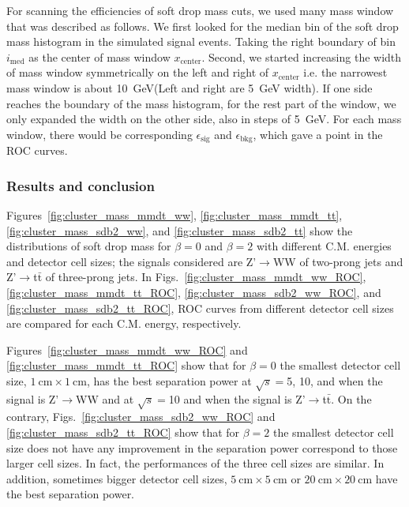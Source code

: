 \documentclass[12pt,twoside,a4paper,an,final]{cms-tdr}
\begin{document}
For scanning the efficiencies of soft drop mass cuts, we used many mass 
window that was described as follows. We first looked for the median bin 
 of the soft drop mass histogram in the simulated signal events. Taking the right boundary
 of bin $i_\mathrm{med}$ as the center of mass window 
$x_\mathrm{center}$. Second, we started increasing the width of mass window symmetrically
 on the left and right of $x_\mathrm{center}$ i.e. the narrowest mass window is 
about 10~GeV(Left and right are 5~GeV width). If one side reaches the boundary of the mass histogram, for the rest part of the window, we only expanded the width on the other side, also in 
steps of 5~GeV. For each mass window, there would be corresponding 
$\epsilon_\mathrm{sig}$ and $\epsilon_\mathrm{bkg}$, which gave a point in the ROC curves.

\subsubsection{Results and conclusion}
Figures~\ref{fig:cluster_mass_mmdt_ww}, \ref{fig:cluster_mass_mmdt_tt},
 \ref{fig:cluster_mass_sdb2_ww}, and \ref{fig:cluster_mass_sdb2_tt} 
show the distributions of soft drop mass for $\beta=0$ and $\beta=2$ with 
different C.M. energies and detector cell sizes; the signals considered are 
Z'$\rightarrow$WW of two-prong jets and Z'$\rightarrow$t$\bar{\mathrm{t}}$ of three-prong jets. 
In Figs.~\ref{fig:cluster_mass_mmdt_ww_ROC}, \ref{fig:cluster_mass_mmdt_tt_ROC}, \ref{fig:cluster_mass_sdb2_ww_ROC}, and \ref{fig:cluster_mass_sdb2_tt_ROC}, 
ROC curves from different detector cell sizes are compared for each C.M. energy, respectively. 

Figures~\ref{fig:cluster_mass_mmdt_ww_ROC} and \ref{fig:cluster_mass_mmdt_tt_ROC} show that for $\beta=0$ the smallest detector cell size, $1~\mathrm{cm}\times1~\mathrm{cm}$, has the best separation power at $\sqrt{s}=$5, 10, and when the signal is Z'$\rightarrow$WW and at  $\sqrt{s}=$10 and when the signal is Z'$\rightarrow$t$\bar{\mathrm{t}}$.
On the contrary, Figs.~\ref{fig:cluster_mass_sdb2_ww_ROC} and \ref{fig:cluster_mass_sdb2_tt_ROC} show that for $\beta=2$ the smallest detector cell size 
does not have any improvement in the separation power correspond to those 
larger cell sizes. In fact, the performances of the three cell sizes are 
similar. In addition, sometimes bigger detector cell sizes, 
$5~\mathrm{cm}\times5~\mathrm{cm}$ or $20~\mathrm{cm}\times20~\mathrm{cm}$
 have the best separation power. 
\end{document}
